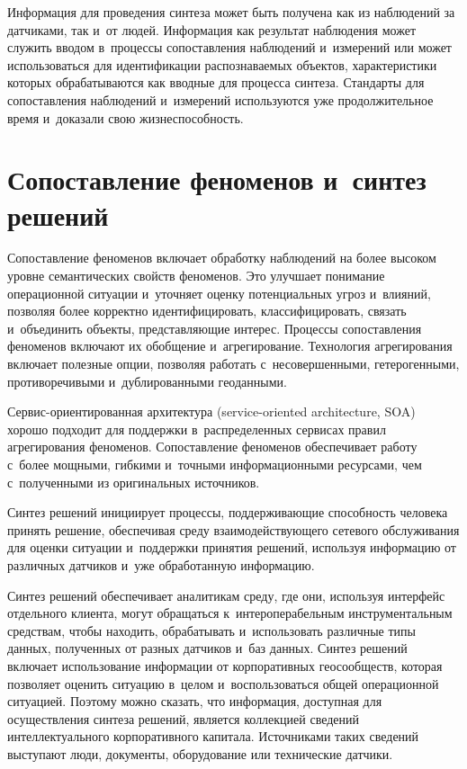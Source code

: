 \begin{multicols}{2}
     
     Информация для проведения синтеза может быть получена как из 
наблюдений за датчиками, так и~от людей. Информация как результат 
наблюдения может служить вводом в~процессы сопоставления наблюдений 
и~измерений или может использоваться для идентификации распознаваемых 
объектов, характеристики которых обрабатываются как вводные для процесса 
синтеза. Стандарты для сопоставления наблюдений и~измерений используются 
уже продолжительное время и~доказали свою жизнеспособность.

\section{Сопоставление феноменов и~синтез решений}
     
     Сопоставление феноменов включает обработку наблюдений на более 
высоком уровне семантических свойств феноменов. Это улучшает понимание 
операционной ситуации и~уточняет оценку потенциальных угроз и~влияний, 
позволяя более корректно идентифицировать, классифицировать, связать 
и~объединить объекты, представляющие интерес. Процессы сопоставления 
феноменов включают их обобщение и~агрегирование. Технология 
агрегирования включает полезные опции, позволяя работать с~несовершенными, 
гетерогенными, противоречивыми и~дублированными геоданными. 
     
     Сервис-ориентированная архитектура (service-oriented architecture, 
     SOA)~\cite{7-dul} хорошо 
подходит для поддержки в~распределенных сервисах правил агрегирования 
феноменов. Сопоставление феноменов обеспечивает работу с~более мощными, 
гибкими и~точными информационными ресурсами, чем с~полученными из 
оригинальных источников. 
     
     Синтез решений инициирует процессы, поддерживающие способность 
человека принять решение, обеспечивая среду взаимодействующего сетевого 
обслуживания для оценки ситуации и~поддержки принятия решений, используя 
информацию от различных датчиков и~уже обработанную информацию.
     
     Синтез решений обеспечивает аналитикам среду, где они, используя 
интерфейс отдельного клиента, могут обращаться к~интероперабельным 
ин\-струментальным средствам, чтобы находить, обрабаты\-вать и~использовать 
различные типы данных, полученных от разных датчиков и~баз данных. Синтез 
решений включает использование информации от корпоративных 
геосообществ, которая позволяет оценить ситуацию в~целом и~воспользоваться 
общей операционной ситуацией. Поэтому можно сказать, что информация, 
доступная для осуществления синтеза решений, является коллекцией сведений 
интеллектуального корпоративного капитала. Источниками таких сведений 
выступают люди, документы, оборудование или технические датчики. 
     

\end{multicols}
